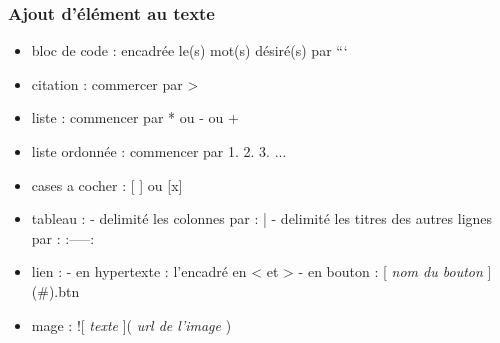 \subsubsection{Ajout d'élément au texte}
\begin{itemize}
	\item bloc de code : encadrée le(s) mot(s) désiré(s) par ```
	\item citation : commercer par >
	\item liste : commencer par * ou - ou +
	\item liste ordonnée : commencer par 1. 2. 3. ...
	\item cases a cocher : [ ] ou [x]
	\item tableau : 
		- delimité les colonnes par : |
		- delimité les titres des autres lignes par : :-----:
	\item lien : 
		- en hypertexte : l'encadré en < et >
		- en bouton : [ \textit{nom du bouton} ](#){.btn }
	\item mage : ![ \textit{texte} ]( \textit{url de l'image} )
\end{itemize}